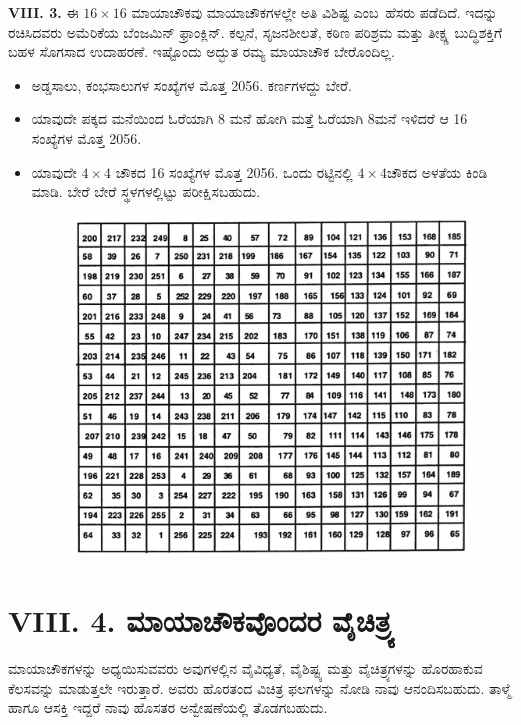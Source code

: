 \noindent \textbf{VIII. 3.} ಈ $16 \times 16$ ಮಾಯಾಚೌಕವು ಮಾಯಾಚೌಕಗಳಲ್ಲೇ ಅತಿ ವಿಶಿಷ್ಟ \hbox{ಎಂಬ ಹೆಸರು} ಪಡೆದಿದೆ. ಇದನ್ನು ರಚಿಸಿದವರು ಅಮೆರಿಕೆಯ ಬೆಂಜಮಿನ್ ಫ್ರಾಂಕ್ಲಿನ್. ಕಲ್ಪನೆ, \hbox{ಸೃಜನಶೀಲತೆ,} ಕಠಿಣ ಪರಿಶ್ರಮ ಮತ್ತು ತೀಕ್ಷ್ಣ ಬುದ್ಧಿಶಕ್ತಿಗೆ ಬಹಳ ಸೊಗಸಾದ ಉದಾಹರಣೆ. ಇಷ್ಟೊಂದು ಅದ್ಭುತ ರಮ್ಯ ಮಾಯಾಚೌಕ ಬೇರೊಂದಿಲ್ಲ.

\begin{itemize}
	\item ಅಡ್ಡಸಾಲು, ಕಂಭಸಾಲುಗಳ ಸಂಖ್ಯೆಗಳ ಮೊತ್ತ 2056. ಕರ್ಣಗಳದ್ದು ಬೇರೆ.\smallskip
	\item ಯಾವುದೇ ಪಕ್ಕದ ಮನೆಯಿಂದ ಓರೆಯಾಗಿ 8 ಮನೆ ಹೋಗಿ ಮತ್ತೆ ಓರೆಯಾಗಿ 8ಮನೆ ಇಳಿದರೆ ಆ 16 ಸಂಖ್ಯೆಗಳ ಮೊತ್ತ 2056.\smallskip
	\item ಯಾವುದೇ $4 \times 4$ ಚೌಕದ 16 ಸಂಖ್ಯೆಗಳ ಮೊತ್ತ 2056. ಒಂದು ರಟ್ಟಿನಲ್ಲಿ $4 \times 4$ಚೌಕದ ಅಳತೆಯ ಕಿಂಡಿ ಮಾಡಿ. ಬೇರೆ ಬೇರೆ ಸ್ಥಳಗಳಲ್ಲಿಟ್ಟು ಪರೀಕ್ಷಿಸಬಹುದು.
	\begin{figure}[H]
	\includegraphics{src/figures/chap7/fig7-7.jpg}
	\end{figure}
\end{itemize}

\section*{VIII. 4. ಮಾಯಾಚೌಕವೊಂದರ ವೈಚಿತ್ರ್ಯ}

ಮಾಯಾಚೌಕಗಳನ್ನು ಅಧ್ಯಯಿಸುವವರು ಅವುಗಳಲ್ಲಿನ ವೈವಿಧ್ಯತೆ, ವೈಶಿಷ್ಟ್ಯ ಮತ್ತು ವೈಚಿತ್ರ್ಯಗಳನ್ನು ಹೊರಹಾಕುವ ಕೆಲಸವನ್ನು ಮಾಡುತ್ತಲೇ ಇರುತ್ತಾರೆ. ಅವರು ಹೊರತಂದ ವಿಚಿತ್ರ ಫಲಗಳನ್ನು ನೋಡಿ ನಾವು ಆನಂದಿಸಬಹುದು. ತಾಳ್ಮೆ ಹಾಗೂ ಆಸಕ್ತಿ ಇದ್ದರೆ ನಾವು ಹೊಸತರ ಅನ್ವೇಷಣೆಯಲ್ಲಿ ತೊಡಗಬಹುದು.

